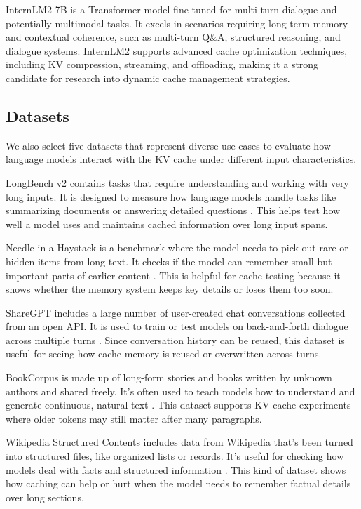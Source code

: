 \documentclass[sigconf,nonacm]{acmart}
\begin{document}
InternLM2 7B \cite{internlm2}is a Transformer model fine-tuned for multi-turn dialogue and potentially multimodal tasks. It excels in scenarios requiring long-term memory and contextual coherence, such as multi-turn Q\&A, structured reasoning, and dialogue systems. InternLM2 supports advanced cache optimization techniques, including KV compression, streaming, and offloading, making it a strong candidate for research into dynamic cache management strategies.  
 
\subsection{Datasets}
\label{sec:subsection}
We also select five datasets that represent diverse use cases to evaluate how language models interact with the KV cache under different input characteristics.

LongBench v2 contains tasks that require understanding and working with very long inputs. It is designed to measure how language models handle tasks like summarizing documents or answering detailed questions \cite{longbenchv2}. This helps test how well a model uses and maintains cached information over long input spans.

Needle-in-a-Haystack is a benchmark where the model needs to pick out rare or hidden items from long text. It checks if the model can remember small but important parts of earlier content \cite{needle}. This is helpful for cache testing because it shows whether the memory system keeps key details or loses them too soon.

ShareGPT includes a large number of user-created chat conversations collected from an open API. It is used to train or test models on back-and-forth dialogue across multiple turns \cite{sharegpt}. Since conversation history can be reused, this dataset is useful for seeing how cache memory is reused or overwritten across turns.

BookCorpus is made up of long-form stories and books written by unknown authors and shared freely. It’s often used to teach models how to understand and generate continuous, natural text \cite{bookcorpus}. This dataset supports KV cache experiments where older tokens may still matter after many paragraphs.

Wikipedia Structured Contents includes data from Wikipedia that’s been turned into structured files, like organized lists or records. It’s useful for checking how models deal with facts and structured information \cite{wikidata}. This kind of dataset shows how caching can help or hurt when the model needs to remember factual details over long sections.
 
\end{document}
